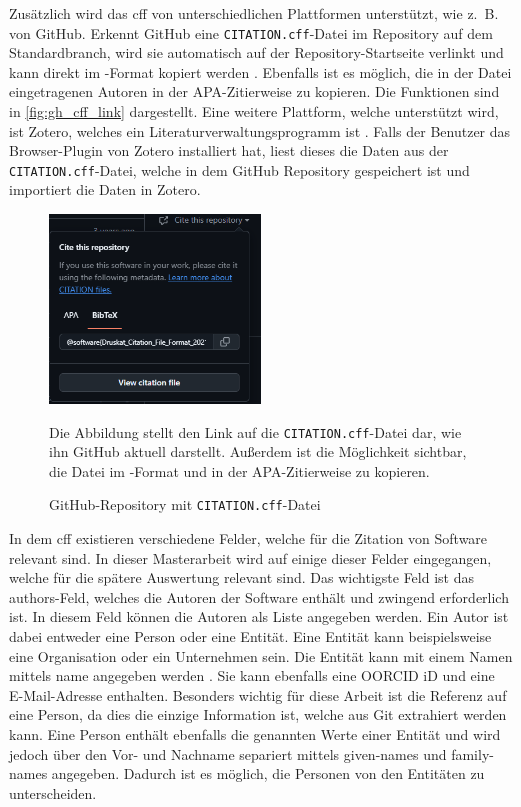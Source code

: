 Zusätzlich wird das \gls{cff} von unterschiedlichen Plattformen unterstützt, wie z. B. von GitHub.
Erkennt GitHub eine \texttt{CITATION.cff}-Datei im Repository auf dem Standardbranch, wird sie automatisch auf der Repository-Startseite verlinkt und kann direkt im -Format kopiert werden \autocites{druskat_citation_2021}{github_about_2024-2}.
Ebenfalls ist es möglich, die in der Datei eingetragenen Autoren in der APA-Zitierweise zu kopieren.
Die Funktionen sind in \autoref{fig:gh_cff_link} dargestellt.
Eine weitere Plattform, welche unterstützt wird, ist Zotero, welches ein Literaturverwaltungsprogramm ist \autocites{druskat_citation_2021}{zotero_zotero_2024}.
Falls der Benutzer das Browser-Plugin von Zotero installiert hat, liest dieses die Daten aus der \texttt{CITATION.cff}-Datei, welche in dem GitHub Repository gespeichert ist und importiert die Daten in Zotero.

\begin{figure}
    \centering
    \includegraphics[width=0.5\textwidth]{bilder/GH_CFF_link.png}
    \caption{GitHub-Repository mit \texttt{CITATION.cff}-Datei}
    \label{fig:gh_cff_link}
    \small
    \raggedright
    Die Abbildung stellt den Link auf die \texttt{CITATION.cff}-Datei dar, wie ihn GitHub aktuell darstellt.
    Außerdem ist die Möglichkeit sichtbar, die Datei im -Format und in der APA-Zitierweise zu kopieren.
\end{figure}

In dem \gls{cff} existieren verschiedene Felder, welche für die Zitation von Software relevant sind.
In dieser Masterarbeit wird auf einige dieser Felder eingegangen, welche für die spätere Auswertung relevant sind.
Das wichtigste Feld ist das \glqq authors\grqq{}-Feld, welches die Autoren der Software enthält und zwingend erforderlich ist.
In diesem Feld können die Autoren als Liste angegeben werden.
Ein Autor ist dabei entweder eine Person oder eine Entität.
Eine Entität kann beispielsweise eine Organisation oder ein Unternehmen sein.
Die Entität kann mit einem Namen mittels \glqq name\grqq{} angegeben werden \autocite{druskat_citation_2021}.
Sie kann ebenfalls eine OORCID iD und eine E-Mail-Adresse enthalten.
Besonders wichtig für diese Arbeit ist die Referenz auf eine Person, da dies die einzige Information ist, welche aus Git extrahiert werden kann.
Eine Person enthält ebenfalls die genannten Werte einer Entität und wird jedoch über den Vor- und Nachname separiert mittels \glqq given-names\grqq{} und \glqq family-names\grqq{} angegeben.
Dadurch ist es möglich, die Personen von den Entitäten zu unterscheiden.


